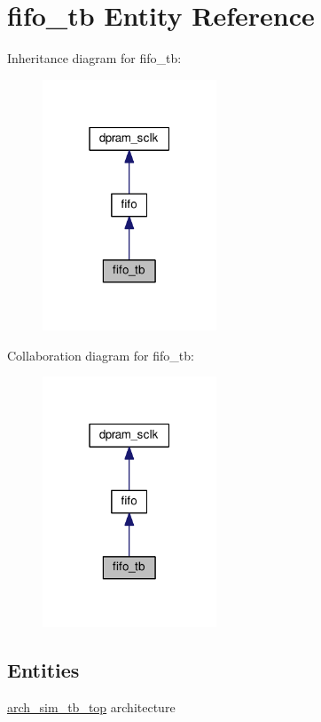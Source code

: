\hypertarget{classfifo__tb}{}\section{fifo\+\_\+tb Entity Reference}
\label{classfifo__tb}


Inheritance diagram for fifo\+\_\+tb\+:\nopagebreak
\begin{figure}[H]
\begin{center}
\leavevmode
\includegraphics[width=147pt]{classfifo__tb__inherit__graph}
\end{center}
\end{figure}


Collaboration diagram for fifo\+\_\+tb\+:\nopagebreak
\begin{figure}[H]
\begin{center}
\leavevmode
\includegraphics[width=147pt]{classfifo__tb__coll__graph}
\end{center}
\end{figure}
\subsection*{Entities}
\begin{DoxyCompactItemize}
\item 
\hyperlink{classfifo__tb_1_1arch__sim__tb__top}{arch\+\_\+sim\+\_\+tb\+\_\+top} architecture
\end{DoxyCompactItemize}
